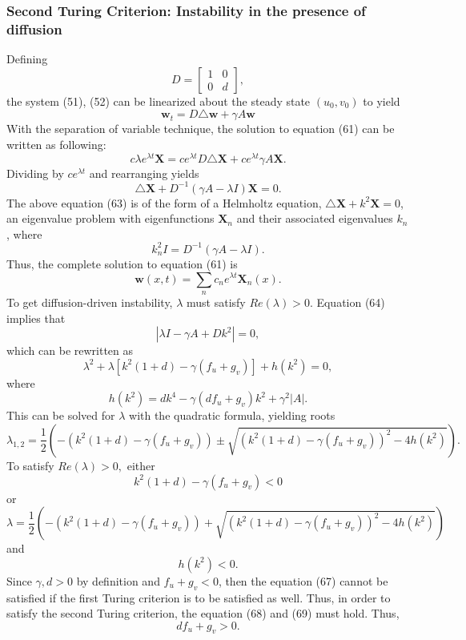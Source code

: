 \documentclass[]{article}
\numberwithin{equation}{section}		%
\begin{document}
\subsubsection{Second Turing Criterion: Instability in the presence of diffusion}
Defining $$D=\begin{bmatrix}
1 & 0 \\
0 & d
\end{bmatrix},$$ the system (51), (52) can be linearized about the steady state $(u_0, v_0)$ to yield \begin{equation}
\textbf{w}_t = D\triangle{\textbf{w}}+\gamma A \textbf{w}
\end{equation}
With the separation of variable technique, the solution to equation (61) can be written as following:
\begin{equation}
c\lambda e^{\lambda t}\textbf{X} = c e^{\lambda t}D\triangle{\textbf{X}}+c e^{\lambda t}\gamma A \textbf{X}.
\end{equation}
Dividing by $ce^{\lambda t}$ and rearranging yields
\begin{equation}
\triangle{\textbf{X}} + D^{-1}(\gamma A - \lambda I)\textbf{X} = 0.
\end{equation}
The above equation (63) is of the form of a Helmholtz equation, $\triangle{\textbf{X}}+k^2 \textbf{X}=0$, an eigenvalue problem with eigenfunctions $\textbf{X}_n$ and their associated eigenvalues $k_n$, where
\begin{equation}
k^{2}_{n} I = D^{-1}(\gamma A - \lambda I).
\end{equation}
Thus, the complete solution to equation (61) is
\begin{equation}
\textbf{w}(x,t)=\sum_n{c_n e^{\lambda t} \textbf{X}_n(x)}.
\end{equation}
To get diffusion-driven instability, $\lambda$ must satisfy $Re(\lambda) > 0$. Equation (64) implies that
$$|\lambda I - \gamma A + Dk^2|=0,$$ which can be rewritten as
$$\lambda^2 + \lambda[k^2(1+d)-\gamma(f_u + g_v)]+h(k^2)=0,$$ where
$$h(k^2)=dk^4-\gamma(df_u+g_v)k^2+\gamma^2|A|.$$
This can be solved for $\lambda$ with the quadratic formula, yielding roots
\begin{equation}
\lambda_{1,2}=\frac{1}{2}(-( k^2(1+d)-\gamma(f_u+g_v))\pm \sqrt{(k^2(1+d)-\gamma(f_u+g_v))^2-4h(k^2)}).
\end{equation}
To satisfy $Re(\lambda) > 0,$ either
\begin{equation}
k^2(1+d)-\gamma(f_u+g_v) < 0
\end{equation}
or
\begin{equation}
\lambda=\frac{1}{2}(-( k^2(1+d)-\gamma(f_u+g_v))+
\sqrt{(k^2(1+d)-\gamma(f_u+g_v))^2-4h(k^2)})
\end{equation}
and
\begin{equation}
h(k^2) < 0.
\end{equation}
Since $\gamma, d > 0$ by definition and $f_u + g_v < 0$, then the equation (67) cannot be satisfied if the first Turing criterion is to be satisfied as well. Thus, in order to satisfy the second Turing criterion, the equation (68) and (69) must hold. Thus,
\begin{equation}
df_u + g_v > 0.
\end{equation}
\end{document}
